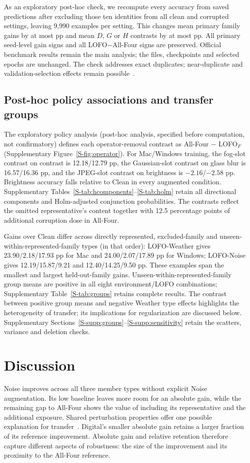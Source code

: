 \documentclass[twoside,a4paper,11pt]{article}
\newcommand{\posthoc}{post-hoc analysis, specified before computation, not confirmatory}
\begin{document}
As an exploratory post-hoc check, we recompute every accuracy from saved predictions after excluding those ten identities from all clean and corrupted settings, leaving 9,990 examples per setting. This changes mean primary family gains by at most \OverlapMaxD{} pp and mean $D$, $G$ or $H$ contrasts by at most \OverlapMaxContrast{} pp. All primary seed-level gain signs and all LOFO$-$All-Four signs are preserved. Official benchmark results remain the main analysis; the files, checkpoints and selected epochs are unchanged. The check addresses exact duplicates; near-duplicate and validation-selection effects remain possible~\cite{barz2020duplicates}.

\subsection{Post-hoc policy associations and transfer groups}
\label{sec:addendum}
The exploratory policy analysis (\posthoc) defines each operator-removal contrast as All-Four $-$ LOFO$_F$ (Supplementary Figure~\ref{S-fig:operator}). For Mac/Windows training, the fog-slot contrast on contrast is 12.18/12.79 pp, the Gaussian-slot contrast on glass blur is 16.57/16.36 pp, and the JPEG-slot contrast on brightness is $-2.16$/$-2.58$ pp. Brightness accuracy falls relative to Clean in every augmented condition. Supplementary Tables~\ref{S-tab:hcomponents}--\ref{S-tab:holm} retain all directional components and Holm-adjusted conjunction probabilities. The contrasts reflect the omitted representative's content together with 12.5 percentage points of additional corruption dose in All-Four.

Gains over Clean differ across directly represented, excluded-family and unseen-within-represented-family types (in that order): LOFO-Weather gives 23.90/2.18/17.93 pp for Mac and 24.00/2.07/17.89 pp for Windows; LOFO-Noise gives 12.19/15.87/9.21 and 12.40/14.25/9.50 pp. These examples span the smallest and largest held-out-family gains. Unseen-within-represented-family group means are positive in all eight environment/LOFO combinations; Supplementary Table~\ref{S-tab:groups} retains complete results. The contrast between positive group means and negative Weather type effects highlights the heterogeneity of transfer; its implications for regularization are discussed below. Supplementary Sections~\ref{S-supp:groups}--\ref{S-supp:sensitivity} retain the scatters, variance and deletion checks.

\section{Discussion}
Noise improves across all three member types without explicit Noise augmentation. Its low baseline leaves more room for an absolute gain, while the remaining gap to All-Four shows the value of including its representative and the additional exposure. Shared perturbation properties offer one possible explanation for transfer~\cite{mintun2021interaction}. Digital's smaller absolute gain retains a larger fraction of its reference improvement. Absolute gain and relative retention therefore capture different aspects of robustness: the size of the improvement and its proximity to the All-Four reference.
\end{document}
